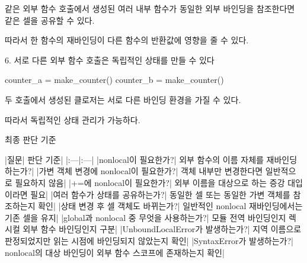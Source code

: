 같은 외부 함수 호출에서 생성된 여러 내부 함수가 동일한 외부 바인딩을 참조한다면 같은 셀을 공유할 수 있다.

따라서 한 함수의 재바인딩이 다른 함수의 반환값에 영향을 줄 수 있다.

\begin{dhknote}
\begin{dhksmry}[centered]
6. 서로 다른 외부 함수 호출은 독립적인 상태를 만들 수 있다
\end{dhksmry}
\end{dhknote}

\begin{dhkcode}
counter_a = make_counter()
counter_b = make_counter()
\end{dhkcode}

두 호출에서 생성된 클로저는 서로 다른 바인딩 환경을 가질 수 있다.

따라서 독립적인 상태 관리가 가능하다.

\begin{dhknote}
\begin{dhksmry}[centered]
최종 판단 기준
\end{dhksmry}
\end{dhknote}

\begin{dhktable}
|질문|	판단 기준|
|:---|:---|
|nonlocal이 필요한가?|	외부 함수의 이름 자체를 재바인딩하는가?|
|가변 객체 변경에 nonlocal이 필요한가?|	객체 내부만 변경한다면 일반적으로 필요하지 않음|
|+=에 nonlocal이 필요한가?|	외부 이름을 대상으로 하는 증강 대입이라면 필요|
|여러 함수가 상태를 공유하는가?|	동일한 셀 또는 동일한 가변 객체를 참조하는지 확인|
|상태 변경 후 셀 객체도 바뀌는가?|	일반적인 nonlocal 재바인딩에서는 기존 셀을 유지|
|global과 nonlocal 중 무엇을 사용하는가?|	모듈 전역 바인딩인지 렉시컬 외부 함수 바인딩인지 구분|
|UnboundLocalError가 발생하는가?|	지역 이름으로 판정되었지만 읽는 시점에 바인딩되지 않았는지 확인|
|SyntaxError가 발생하는가?|	nonlocal의 대상 바인딩이 외부 함수 스코프에 존재하는지 확인|
\end{dhktable}